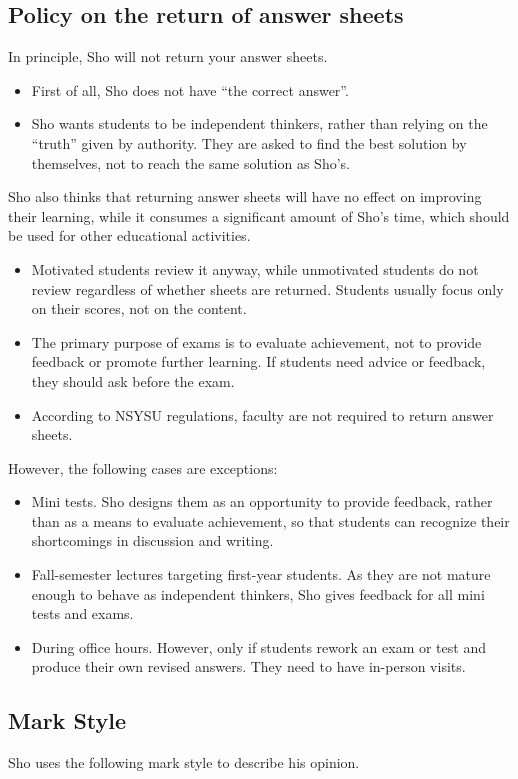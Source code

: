 \documentclass[11pt,pdfa,lastpage,minititle]{MishoNote}
\begin{document}
\subsection*{Policy on the return of answer sheets}
In principle, Sho will not return your answer sheets.
\begin{itemize}
  \item First of all, Sho does not have ``the correct answer''.
  \item Sho wants students to be independent thinkers, rather than relying on the ``truth'' given by authority.
        They are asked to find the best solution by themselves, not to reach the same solution as Sho's.
\end{itemize}
Sho also thinks that returning answer sheets will have no effect on improving their learning, while it consumes a significant amount of Sho's time, which should be used for other educational activities.
\begin{itemize}
  \item Motivated students review it anyway, while unmotivated students do not review regardless of whether sheets are returned. Students usually focus only on their scores, not on the content.
  \item The primary purpose of exams is to evaluate achievement, not to provide feedback or promote further learning. If students need advice or feedback, they should ask before the exam.
  \item According to NSYSU regulations, faculty are not required to return answer sheets.
\end{itemize}
 However, the following cases are exceptions:
\begin{itemize}
  \item Mini tests. Sho designs them as an opportunity to provide feedback, rather than as a means to evaluate achievement, so that students can recognize their shortcomings in discussion and writing.
  \item Fall-semester lectures targeting first-year students. As they are not mature enough to behave as independent thinkers, Sho gives feedback for all mini tests and exams.
  \item During office hours. However, only if students rework an exam or test and produce their own revised answers. They need to have in-person visits.
\end{itemize}

\subsection*{Mark Style}
Sho uses the following mark style to describe his opinion.
\end{document}

